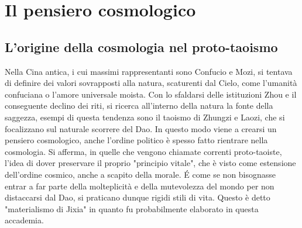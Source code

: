 \documentclass[10pt,a4paper]{report}
\begin{document}
\section{Il pensiero cosmologico}
\subsection{L'origine della cosmologia nel proto-taoismo}
Nella Cina antica, i cui massimi rappresentanti sono Confucio e Mozi, si tentava di definire dei valori sovrapposti alla natura, scaturenti dal Cielo, come l'umanità confuciana o l'amore universale moista. Con lo sfaldarsi delle istituzioni Zhou e il conseguente declino dei riti, si ricerca all'interno della natura la fonte della saggezza, esempi di questa tendenza sono il taoismo di Zhungzi e Laozi, che si focalizzano sul naturale scorrere del Dao. In questo modo viene a crearsi un pensiero cosmologico, anche l'ordine politico è spesso fatto rientrare nella cosmologia. Si afferma, in quelle che vengono chiamate correnti proto-taoiste, l'idea di dover preservare il proprio "principio vitale", che è visto come estensione dell'ordine cosmico, anche a scapito della morale. \'E come se non bisognasse entrar a far parte della molteplicità e della mutevolezza del mondo per non distaccarsi dal Dao, si praticano dunque rigidi stili di vita. Questo è detto "materialismo di Jixia" in quanto fu probabilmente elaborato in questa accademia.    
\end{document}
